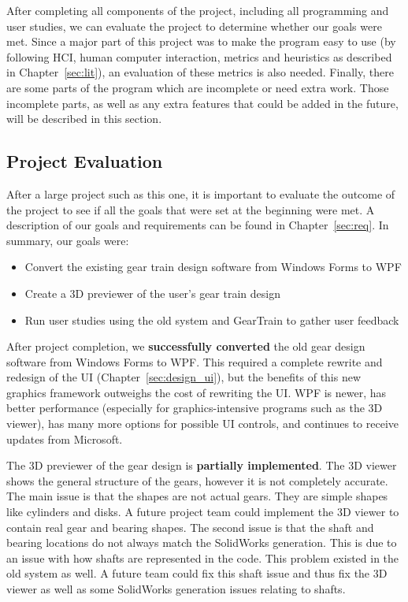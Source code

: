 \begin{doublespace}
After completing all components of the project, including all programming and user studies, we can evaluate the project to determine whether our goals were met. Since a major part of this project was to make the program easy to use (by following HCI, human computer interaction, metrics and heuristics as described in Chapter~\ref{sec:lit}), an evaluation of these metrics is also needed. Finally, there are some parts of the program which are incomplete or need extra work. Those incomplete parts, as well as any extra features that could be added in the future, will be described in this section.

\subsection{Project Evaluation}
After a large project such as this one, it is important to evaluate the outcome of the project to see if all the goals that were set at the beginning were met. A description of our goals and requirements can be found in Chapter~\ref{sec:req}. In summary, our goals were:
\begin{itemize}
    \item Convert the existing gear train design software from Windows Forms to WPF
    \item Create a 3D previewer of the user's gear train design
    \item Run user studies using the old system and GearTrain to gather user feedback
\end{itemize}

After project completion, we \textbf{successfully converted} the old gear design software from Windows Forms to WPF. This required a complete rewrite and redesign of the UI (Chapter~\ref{sec:design_ui}), but the benefits of this new graphics framework outweighs the cost of rewriting the UI. WPF is newer, has better performance (especially for graphics-intensive programs such as the 3D viewer), has many more options for possible UI controls, and continues to receive updates from Microsoft.  

The 3D previewer of the gear design is \textbf{partially implemented}. The 3D viewer shows the general structure of the gears, however it is not completely accurate. The main issue is that the shapes are not actual gears. They are simple shapes like cylinders and disks. A future project team could implement the 3D viewer to contain real gear and bearing shapes. The second issue is that the shaft and bearing locations do not always match the SolidWorks generation. This is due to an issue with how shafts are represented in the code. This problem existed in the old system as well. A future team could fix this shaft issue and thus fix the 3D viewer as well as some SolidWorks generation issues relating to shafts.


\end{doublespace}
